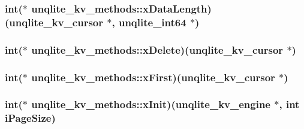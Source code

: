 \hypertarget{structunqlite__kv__methods_a1294a3c4e87589358ba1ada4471a9c2a}{
\subsubsection[{x\-Data\-Length}]{\setlength{\rightskip}{0pt plus 5cm}int($\ast$ unqlite\-\_\-kv\-\_\-methods\-::x\-Data\-Length)({\bf unqlite\-\_\-kv\-\_\-cursor} $\ast$, {\bf unqlite\-\_\-int64} $\ast$)}}\label{d2/dfb/structunqlite__kv__methods_a1294a3c4e87589358ba1ada4471a9c2a}
\hypertarget{structunqlite__kv__methods_a83aa7b58b08550a4814b4184eddb8d3c}{
\subsubsection[{x\-Delete}]{\setlength{\rightskip}{0pt plus 5cm}int($\ast$ unqlite\-\_\-kv\-\_\-methods\-::x\-Delete)({\bf unqlite\-\_\-kv\-\_\-cursor} $\ast$)}}\label{d2/dfb/structunqlite__kv__methods_a83aa7b58b08550a4814b4184eddb8d3c}
\hypertarget{structunqlite__kv__methods_a18e040ebb42c50ced03d545d48b98c72}{
\subsubsection[{x\-First}]{\setlength{\rightskip}{0pt plus 5cm}int($\ast$ unqlite\-\_\-kv\-\_\-methods\-::x\-First)({\bf unqlite\-\_\-kv\-\_\-cursor} $\ast$)}}\label{d2/dfb/structunqlite__kv__methods_a18e040ebb42c50ced03d545d48b98c72}
\hypertarget{structunqlite__kv__methods_a0963f71dc84b26969847a47de6612d77}{
\subsubsection[{x\-Init}]{\setlength{\rightskip}{0pt plus 5cm}int($\ast$ unqlite\-\_\-kv\-\_\-methods\-::x\-Init)({\bf unqlite\-\_\-kv\-\_\-engine} $\ast$, int i\-Page\-Size)}}\label{d2/dfb/structunqlite__kv__methods_a0963f71dc84b26969847a47de6612d77}
